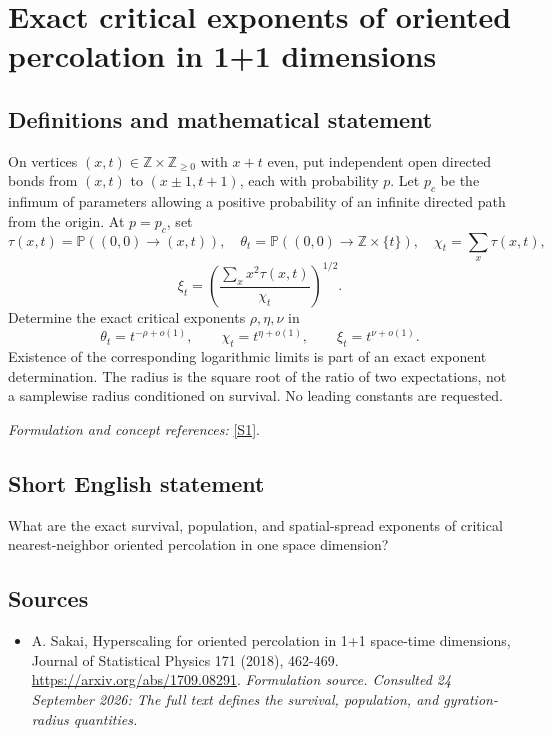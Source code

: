 \documentclass[11pt]{article}
\begin{document}
\section*{\texorpdfstring{Exact critical exponents of oriented percolation in 1+1 dimensions}{Exact critical exponents of oriented percolation in 1+1 dimensions}}\label{457}
\subsection{Definitions and mathematical statement}
On vertices $(x,t)\in{\mathbb{Z}}\times{\mathbb{Z}}_{\ge0}$ with $x+t$ even, put independent open directed bonds from $(x,t)$ to $(x\pm1,t+1)$, each with probability $p$. Let $p_c$ be the infimum of parameters allowing a positive probability of an infinite directed path from the origin. At $p=p_c$, set
\[
 \tau(x,t)={\mathbb{P}}((0,0)\to(x,t)),\quad
 \theta_t={\mathbb{P}}((0,0)\to{\mathbb{Z}}\times\{t\}),\quad
 \chi_t=\sum_x\tau(x,t),
\]
\[
 \xi_t=\left(\frac{\sum_xx^2\tau(x,t)}{\chi_t}\right)^{1/2}.
\]
Determine the exact critical exponents $\rho,\eta,\nu$ in
\[
 \theta_t=t^{-\rho+o(1)},\qquad
 \chi_t=t^{\eta+o(1)},\qquad \xi_t=t^{\nu+o(1)}.
\]
Existence of the corresponding logarithmic limits is part of an exact exponent determination. The radius is the square root of the ratio of two expectations, not a samplewise radius conditioned on survival. No leading constants are requested.
\par\smallskip\textit{Formulation and concept references:} \href{https://arxiv.org/abs/1709.08291}{[S1]}.

\subsection{Short English statement}
What are the exact survival, population, and spatial-spread exponents of critical nearest-neighbor oriented percolation in one space dimension?
\subsection{Sources}
\begin{itemize}
\item[S1]A. Sakai, Hyperscaling for oriented percolation in 1+1 space-time dimensions, Journal of Statistical Physics 171 (2018), 462-469.
\url{https://arxiv.org/abs/1709.08291}.
\textit{Formulation source. Consulted 24 September 2026: The full text defines the survival, population, and gyration-radius quantities.}
\end{itemize}
\end{document}

